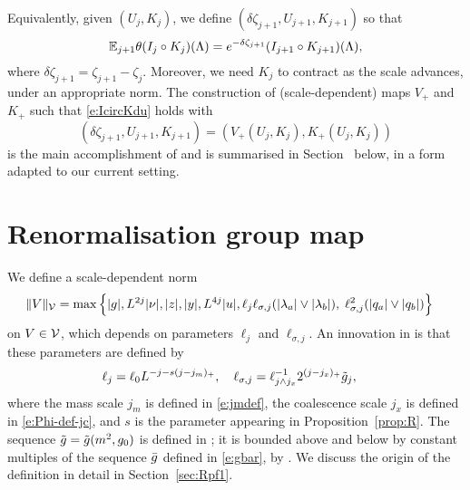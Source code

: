 Equivalently, given $(U_j, K_j)$, we define $(\delta\zeta_{j+1}, U_{j+1}, K_{j+1})$ so that
\begin{equation} \label{e:IcircKdu}
  \mathbb{E}_{j+1}\theta(I_j \circ K_j)(\Lambda)
  =
  e^{-\delta \zeta_{j+1}}(I_{j+1} \circ K_{j+1})(\Lambda),
\end{equation}
where $\delta\zeta_{j+1} = \zeta_{j+1} - \zeta_j$.
Moreover, we need $K_j$ to contract as the scale advances, under an appropriate norm.
The construction of (scale-dependent) maps $V_+$ and $K_+$ such that
\eqref{e:IcircKdu} holds with
\begin{equation}
    (\delta\zeta_{j+1}, U_{j+1}, K_{j+1}) = (V_+(U_j, K_j), K_+(U_j, K_j))
\end{equation}
is the main accomplishment of \cite{BS-rg-step} and is summarised in Section~\REF %
below, in a form adapted to our current setting.

\section{Renormalisation group map}
\label{sec:step}

We define a scale-dependent norm
\begin{equation}
\label{e:Vnormdef}
\begin{aligned}
\|V\|_{\mathcal{V}} &=
\max\Big\{
|g|, L^{2j}|\nu|, |z|, |y|,  L^{4j}|u|,
\ell_j\ell_{\sigma,j}(|\lambda_a|\vee|\lambda_b|),\;
 \ell_{\sigma,j}^{2} (|q_a|\vee|q_b|)
\Big\}
\end{aligned}
\end{equation}
on $V \in \mathcal{V}$, which depends on parameters $\ell_j$ and $\ell_{\sigma,j}$.
An innovation in %
\cite{BSTW-clp} is that these parameters are defined by
\begin{align}
\label{e:elldef-zz}
\ell_j &= \ell_0 L^{-j - s (j - j_m)_+}, \quad
\ell_{\sigma,j}
=
\ell_{j \wedge j_{x}}^{-1} 2^{(j - j_{x})_+} \tilde{g}_j,
\end{align}
where the mass scale $j_m$ is defined in \eqref{e:jmdef},
the coalescence scale
$j_x$ is defined in \eqref{e:Phi-def-jc},
and $s$ is the parameter appearing in Proposition~\ref{prop:R}.
The sequence $\tilde{g} = \tilde{g}(m^2,g_0)$ is defined in
\cite[\eqref{log-e:ggendef}]{BBS-saw4-log};
it is bounded above and below by constant multiples of
the sequence $\bar{g}$ defined in
\eqref{e:gbar},
by
\cite[Lemma~\ref{log-lem:gbarmcomp}]{BBS-saw4-log}.
We discuss the origin of the definition  in detail
in Section~\ref{sec:Rpf1}.

